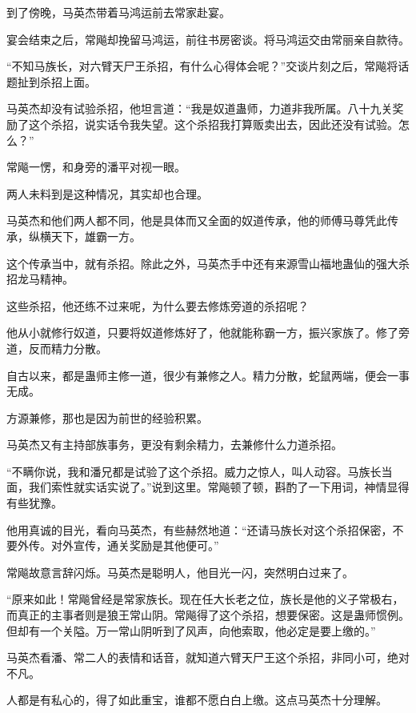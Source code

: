 
\begin{this_body}

到了傍晚，马英杰带着马鸿运前去常家赴宴。

宴会结束之后，常飚却挽留马鸿运，前往书房密谈。将马鸿运交由常丽亲自款待。

“不知马族长，对六臂天尸王杀招，有什么心得体会呢？”交谈片刻之后，常飚将话题扯到杀招上面。

马英杰却没有试验杀招，他坦言道：“我是奴道蛊师，力道非我所属。八十九关奖励了这个杀招，说实话令我失望。这个杀招我打算贩卖出去，因此还没有试验。怎么？”

常飚一愣，和身旁的潘平对视一眼。

两人未料到是这种情况，其实却也合理。

马英杰和他们两人都不同，他是具体而又全面的奴道传承，他的师傅马尊凭此传承，纵横天下，雄霸一方。

这个传承当中，就有杀招。除此之外，马英杰手中还有来源雪山福地蛊仙的强大杀招龙马精神。

这些杀招，他还练不过来呢，为什么要去修炼旁道的杀招呢？

他从小就修行奴道，只要将奴道修炼好了，他就能称霸一方，振兴家族了。修了旁道，反而精力分散。

自古以来，都是蛊师主修一道，很少有兼修之人。精力分散，蛇鼠两端，便会一事无成。

方源兼修，那也是因为前世的经验积累。

马英杰又有主持部族事务，更没有剩余精力，去兼修什么力道杀招。

“不瞒你说，我和潘兄都是试验了这个杀招。威力之惊人，叫人动容。马族长当面，我们索性就实话实说了。”说到这里。常飚顿了顿，斟酌了一下用词，神情显得有些犹豫。

他用真诚的目光，看向马英杰，有些赫然地道：“还请马族长对这个杀招保密，不要外传。对外宣传，通关奖励是其他便可。”

常飚故意言辞闪烁。马英杰是聪明人，他目光一闪，突然明白过来了。

“原来如此！常飚曾经是常家族长。现在任大长老之位，族长是他的义子常极右，而真正的主事者则是狼王常山阴。常飚得了这个杀招，想要保密。这是蛊师惯例。但却有一个关隘。万一常山阴听到了风声，向他索取，他必定是要上缴的。”

马英杰看潘、常二人的表情和话音，就知道六臂天尸王这个杀招，非同小可，绝对不凡。

人都是有私心的，得了如此重宝，谁都不愿白白上缴。这点马英杰十分理解。


\end{this_body}
